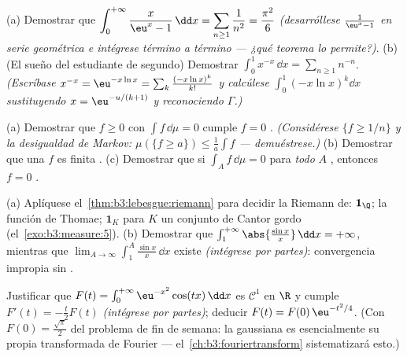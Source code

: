 \begin{exercise}[$\star\star$]\label{exo:b3:lebesgue:4}
(a) Demostrar que $\displaystyle\int_0^{+\infty}\frac{x}{\eu^x -
1}\,\dd x = \sum_{n\geq1}\frac1{n^2} = \frac{\pi^2}6$
\emph{(desarróllese $\frac1{\eu^x - 1}$ en serie geométrica e intégrese
término a término --- ¿qué teorema lo permite?)}. (b) (El sueño del
estudiante de segundo) Demostrar
$\displaystyle\int_0^1 x^{-x}\,\dd x = \sum_{n\geq1}n^{-n}$.
\emph{(Escríbase $x^{-x} = \eu^{-x\ln x} = \sum_k\frac{(-x\ln
x)^k}{k!}$ y calcúlese $\int_0^1(-x\ln x)^k\dd x$ sustituyendo
$x = \eu^{-u/(k+1)}$ y reconociendo $\Gamma$.)}
\end{exercise}

\begin{exercise}[$\star\star$]\label{exo:b3:lebesgue:5}
(a) Demostrar que $f \geq 0$
 con $\int f\,\dd\mu = 0$
cumple $f = 0$ . \emph{(Considérese $\{f \geq 1/n\}$ y
la desigualdad de Markov: $\mu(\{f \geq a\}) \leq \frac1a\int f$ ---
demuéstrese.)} (b) Demostrar que una $f$
 es finita .
(c) Demostrar que si $\int_A f\,\dd\mu = 0$ para \emph{todo} $A$
, entonces $f = 0$ .
\end{exercise}

\begin{exercise}[$\star\star$]\label{exo:b3:lebesgue:6}
(a) Aplíquese el~\cref{thm:b3:lebesgue:riemann} para decidir la
 Riemann de: $\mathbf 1_\Q$;
la función de Thomae; $\mathbf
1_K$ para $K$ un conjunto de Cantor gordo (el~\cref{exo:b3:measure:5}).
(b) Demostrar que $\int_1^{+\infty}\abs{\frac{\sin x}x}\,\dd x =
+\infty$, mientras que $\lim_{A\to\infty}\int_1^A\frac{\sin
x}x\,\dd x$ existe \emph{(intégrese por partes)}: convergencia impropia
sin .
\end{exercise}

\begin{exercise}[$\star\star$]\label{exo:b3:lebesgue:7}
Justificar que $F(t) = \int_0^{+\infty}\eu^{-x^2}\cos(tx)\,\dd x$ es
$\mathcal C^1$ en $\R$ y cumple $F'(t) = -\frac t2F(t)$ \emph{(intégrese
por partes)}; deducir $F(t) =
F(0)\,\eu^{-t^2/4}$. (Con $F(0) = \frac{\sqrt\pi}2$ del problema de fin
de semana: la gaussiana es esencialmente su propia transformada de
Fourier --- el~\cref{ch:b3:fouriertransform} sistematizará esto.)
\end{exercise}

